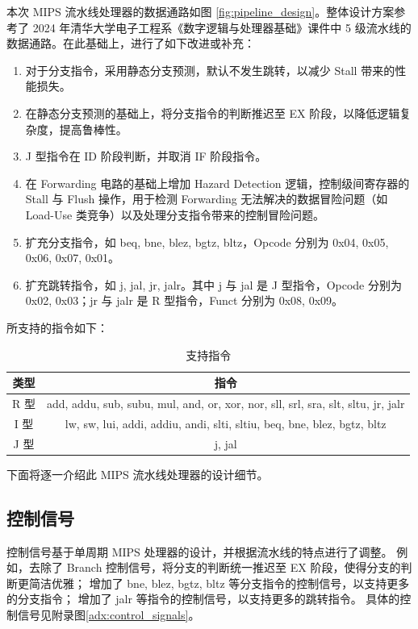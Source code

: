\documentclass[a4paper]{article}  %
\begin{document}
本次 MIPS 流水线处理器的数据通路如图 \ref{fig:pipeline_design}。整体设计方案参考了 2024 年清华大学电子工程系《数字逻辑与处理器基础》课件中 5 级流水线的数据通路。在此基础上，进行了如下改进或补充：

\begin{enumerate}[1]
    \item 对于分支指令，采用静态分支预测，默认不发生跳转，以减少 Stall 带来的性能损失。
    \item 在静态分支预测的基础上，将分支指令的判断推迟至 EX 阶段，以降低逻辑复杂度，提高鲁棒性。
    \item J 型指令在 ID 阶段判断，并取消 IF 阶段指令。
    \item 在 Forwarding 电路的基础上增加 Hazard Detection 逻辑，控制级间寄存器的 Stall 与 Flush 操作，用于检测 Forwarding 无法解决的数据冒险问题（如 Load-Use 类竞争）以及处理分支指令带来的控制冒险问题。
    \item 扩充分支指令，如 beq, bne, blez, bgtz, bltz，Opcode 分别为 0x04, 0x05, 0x06, 0x07, 0x01。
    \item 扩充跳转指令，如 j, jal, jr, jalr。其中 j 与 jal 是 J 型指令，Opcode 分别为 0x02, 0x03；jr 与 jalr 是 R 型指令，Funct 分别为 0x08, 0x09。
\end{enumerate}

所支持的指令如下：

\begin{table}[htb]
    \centering
    \caption{
        支持指令
    }\label{tab:instructions}
    \begin{tabular}{cc}
        \toprule
        \textbf{类型} & \textbf{指令} \\
        \midrule
        R 型 & add, addu, sub, subu, mul, and, or, xor, nor, sll, srl, sra, slt, sltu, jr, jalr \\
        I 型 & lw, sw, lui, addi, addiu, andi, slti, sltiu, beq, bne, blez, bgtz, bltz \\
        J 型 & j, jal \\
        \bottomrule
    \end{tabular}
\end{table}
下面将逐一介绍此 MIPS 流水线处理器的设计细节。

\subsection{控制信号}

控制信号基于单周期 MIPS 处理器的设计，并根据流水线的特点进行了调整。
例如，去除了 Branch 控制信号，将分支的判断统一推迟至 EX 阶段，使得分支的判断更简洁优雅；
增加了 bne, blez, bgtz, bltz 等分支指令的控制信号，以支持更多的分支指令；
增加了 jalr 等指令的控制信号，以支持更多的跳转指令。
具体的控制信号见附录图\ref{adx:control_signals}。
\end{document}
